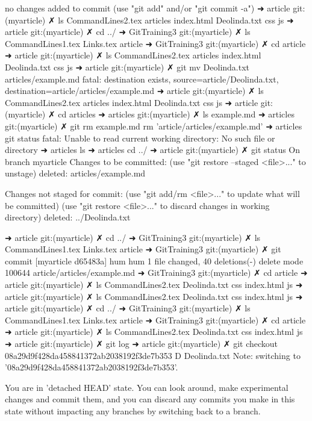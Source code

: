 no changes added to commit (use "git add" and/or "git commit -a")
➜  article git:(myarticle) ✗ ls
CommandLines2.tex articles          index.html
Deolinda.txt      css               js
➜  article git:(myarticle) ✗ cd ../
➜  GitTraining3 git:(myarticle) ✗ ls
CommandLines1.tex Links.tex         article
➜  GitTraining3 git:(myarticle) ✗ cd article 
➜  article git:(myarticle) ✗ ls
CommandLines2.tex articles          index.html
Deolinda.txt      css               js
➜  article git:(myarticle) ✗ git mv Deolinda.txt articles/example.md 
fatal: destination exists, source=article/Deolinda.txt, destination=article/articles/example.md
➜  article git:(myarticle) ✗ ls 
CommandLines2.tex articles          index.html
Deolinda.txt      css               js
➜  article git:(myarticle) ✗ cd articles 
➜  articles git:(myarticle) ✗ ls
example.md
➜  articles git:(myarticle) ✗ git rm example.md 
rm 'article/articles/example.md'
➜  articles git status
fatal: Unable to read current working directory: No such file or directory
➜  articles ls
➜  articles cd ../
➜  article git:(myarticle) ✗ git status
On branch myarticle
Changes to be committed:
  (use "git restore --staged <file>..." to unstage)
	deleted:    articles/example.md

Changes not staged for commit:
  (use "git add/rm <file>..." to update what will be committed)
  (use "git restore <file>..." to discard changes in working directory)
	deleted:    ../Deolinda.txt

➜  article git:(myarticle) ✗ cd ../
➜  GitTraining3 git:(myarticle) ✗ ls
CommandLines1.tex Links.tex         article
➜  GitTraining3 git:(myarticle) ✗ git commit
[myarticle d65483a] hum hum
 1 file changed, 40 deletions(-)
 delete mode 100644 article/articles/example.md
➜  GitTraining3 git:(myarticle) ✗ cd article 
➜  article git:(myarticle) ✗ ls
CommandLines2.tex Deolinda.txt      css               index.html        js
➜  article git:(myarticle) ✗ ls
CommandLines2.tex Deolinda.txt      css               index.html        js
➜  article git:(myarticle) ✗ cd ../
➜  GitTraining3 git:(myarticle) ✗ ls
CommandLines1.tex Links.tex         article
➜  GitTraining3 git:(myarticle) ✗ cd article 
➜  article git:(myarticle) ✗ ls
CommandLines2.tex Deolinda.txt      css               index.html        js
➜  article git:(myarticle) ✗ git log
➜  article git:(myarticle) ✗ git checkout 08a29d9f428da458841372ab2038192f3de7b353
D	Deolinda.txt
Note: switching to '08a29d9f428da458841372ab2038192f3de7b353'.

You are in 'detached HEAD' state. You can look around, make experimental
changes and commit them, and you can discard any commits you make in this
state without impacting any branches by switching back to a branch.

